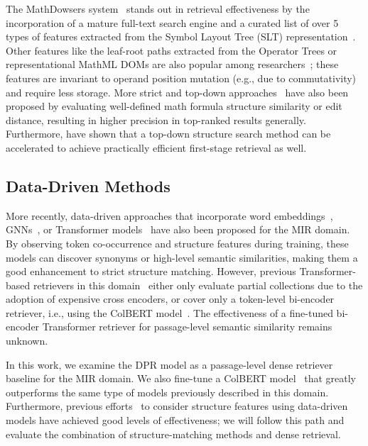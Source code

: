 \documentclass[11pt]{article}
\begin{document}
The MathDowsers system~\cite{fraser2018tangentL,ng2020dowsing,ng2021dowsing,ng2021thesis} stands out in retrieval effectiveness by the incorporation of a mature full-text search engine and a curated list of over 5 types of features extracted from the Symbol Layout Tree (SLT) representation~\cite{zanibbi2012survey}.
Other features like the leaf-root paths extracted from the Operator Trees or representational MathML DOMs are also popular among researchers~\cite{hijikata2009search,yokoi2009approach,zhong2015thesis,zhong2016opmes}; these features are invariant to operand position mutation (e.g., due to commutativity) and require less storage.
More strict and top-down approaches~\cite{kohlhase2008mathwebsearch,schellenberg2012layout,zanibbi2016multi,zhong2019structural,mansouri2020tangentcfted} have also been proposed by evaluating well-defined math formula structure similarity or edit distance, resulting in higher precision in top-ranked results generally.
Furthermore, \citet{zhong2020accelerating} have shown that a top-down structure search method can be accelerated to achieve practically efficient first-stage retrieval as well.

\subsection{Data-Driven Methods}

More recently, data-driven approaches that incorporate word embeddings~\cite{gao2017preliminary,mansouri2019tangentcft}, GNNs~\cite{song2021GNN}, or Transformer models~\cite{peng2021mathbert,reusch2021albert,reusch2021tu_dbs} have also been proposed for the MIR domain.
By observing token co-occurrence and structure features during training, these models can discover synonyms or high-level semantic similarities, making them a good enhancement to strict structure matching.
However, previous Transformer-based retrievers in this domain~\cite{mansouri2021dprl,reusch2021albert,reusch2021tu_dbs} either only evaluate partial collections due to the adoption of expensive cross encoders, or cover only a token-level bi-encoder retriever, i.e., using the ColBERT model~\cite{khattab2020colbert,santhanam2021colbertv2}.
The effectiveness of a fine-tuned bi-encoder Transformer retriever for passage-level semantic similarity remains unknown.

In this work, we examine the DPR model \cite{karpukhin2020dpr} as a passage-level dense retriever baseline for the MIR domain.
We also fine-tune a ColBERT model~\cite{khattab2020colbert} that greatly outperforms the same type of models previously described in this domain.
Furthermore, previous efforts~\cite{mansouri2019tangentcft,peng2021mathbert} to consider structure features using data-driven models have achieved good levels of effectiveness; we will follow this path and evaluate the combination of structure-matching methods and dense retrieval.
\end{document}
